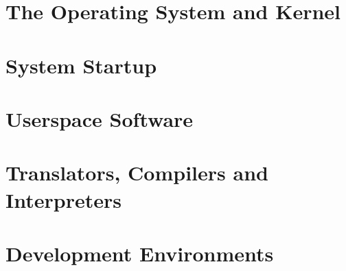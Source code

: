 \documentclass[../main.tex]{subfiles}
\begin{document}
\section{The Operating System and Kernel}
\label{4:sec:the_os_and_kernel}


\section{System Startup}
\label{4:sec:system_startup}


\section{Userspace Software}
\label{4:sec:userspace_software}


\section{Translators, Compilers and Interpreters}
\label{4:sec:translators_compilers_and_interpreters}


\section{Development Environments}
\label{4:sec:development_environments}

\end{document}
